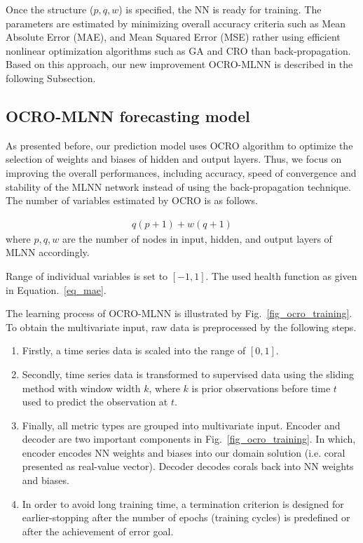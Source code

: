 \documentclass[11pt,twoside]{article}
\begin{document}
\begin{multicols}{2}
Once the structure ($p, q, w$) is specified, the NN is ready for training. 
The parameters are estimated by minimizing overall accuracy criteria such as Mean Absolute Error (MAE), and Mean Squared Error (MSE) rather using efficient nonlinear optimization algorithms such as GA and CRO than back-propagation. Based on this approach, our new improvement OCRO-MLNN is described in the following Subsection.

\subsection{OCRO-MLNN forecasting model}
\label{ocro_mlnn_model}
As presented before, our prediction model uses OCRO algorithm to optimize the selection of weights and biases of hidden and output layers. Thus, we focus on improving the overall performances, including accuracy, speed of convergence and stability of the MLNN network instead of using the back-propagation technique. The number of variables estimated by OCRO is as follows.

\begin{align}
	q (p + 1) + w (q + 1) 
\end{align}
where $p, q, w$ are the number of nodes in input, hidden, and output layers of MLNN accordingly. 

Range of individual variables is set to $[-1, 1]$. The used health function as given in Equation.~\ref{eq_mae}.



The learning process of OCRO-MLNN is illustrated by Fig.~\ref{fig_ocro_training}. To obtain the multivariate input, raw data is preprocessed by the following steps.

\begin{enumerate}
	\item Firstly, a time series data is scaled into the range of $[0, 1]$. 
	\item Secondly, time series data is transformed to supervised data using the sliding method with window width $k$, where $k$ is prior observations before time $t$ used to predict the observation at $t$. 
	\item Finally, all metric types are grouped into multivariate input. Encoder and decoder are two important components in Fig.~\ref{fig_ocro_training}. In which, encoder encodes NN weights and biases into our domain solution (i.e. coral presented as real-value vector). Decoder decodes corals back into NN weights and biases. 
	\item In order to avoid long training time, a termination criterion is designed for earlier-stopping after the number of epochs (training cycles) is predefined or after the achievement of error goal. 
\end{enumerate}


\end{multicols}
\end{document}
